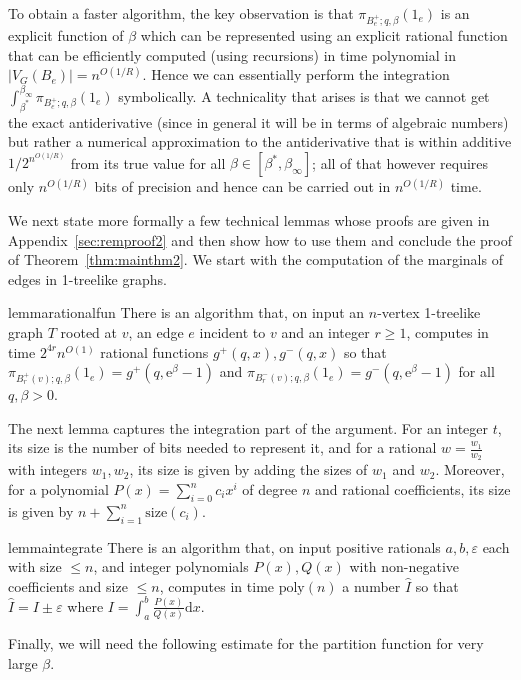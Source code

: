 \documentclass[11pt]{article}
\theoremstyle{plain}
\let\epsilon=\varepsilon
\newcommand{\emm}{\mathrm{e}}
\newcommand{\1}{\mathbb{1}}
\begin{document}
To obtain a faster algorithm, the key observation is that $\pi_{B_e^+;q,\beta}(1_e)$ is an explicit function of $\beta$ which can be represented using an explicit rational function that can be efficiently computed (using recursions) in time polynomial in $|V_G(B_e)|=n^{O(1/R)}$. Hence we can essentially perform the integration $\int^{\beta_\infty}_{\beta^*}\pi_{B_e^+;q,\beta}(1_e)$ symbolically. A technicality that arises is that we cannot get the exact antiderivative (since in general it will be in terms of algebraic numbers) but rather a numerical approximation to the antiderivative that is within additive $1/2^{n^{O(1/R)}}$ from its true value for all $\beta\in [\beta^*,\beta_\infty]$; all of that however requires only $n^{O(1/R)}$ bits of precision and hence can be carried out in $n^{O(1/R)}$ time.  

We next state more formally a few technical lemmas whose proofs are given in Appendix~\ref{sec:remproof2} and then show how to use them and conclude the proof of Theorem~\ref{thm:mainthm2}. We start with the computation of the marginals of edges in 1-treelike graphs.
\begin{restatable}{lemma}{rationalfun}\label{lem:rationalfun}
There is an algorithm that, on input an $n$-vertex  1-treelike graph $T$  rooted at $v$, an edge $e$ incident to $v$ and an integer $r\geq 1$, computes in time $2^{4r}n^{O(1)}$ rational functions $g^+(q,x), g^-(q,x)$ so that $\pi_{B^+_r(v);q,\beta}(1_e)=g^+(q,\emm^\beta-1)$ and $\pi_{B^-_r(v);q,\beta}(1_e)=g^-(q,\emm^{\beta}-1)$ for all $q,\beta>0$.
\end{restatable}
The next lemma captures the integration part of the argument. For an integer $t$, its size is the number of bits needed to represent it, and for a rational $w=\frac{w_1}{w_2}$ with integers $w_1,w_2$, its size is given by adding the sizes of $w_1$ and $w_2$. Moreover, for a polynomial $P(x)=\sum^n_{i=0}c_i x^{i}$ of degree $n$ and rational  coefficients, its size is given by   $n+\sum^n_{i=1}\mathrm{size}(c_i)$.
\begin{restatable}{lemma}{integrate}\label{lem:integrate}
There is an algorithm that, on input positive rationals $a,b, \epsilon$ each with size $\leq n$, and integer polynomials $P(x), Q(x)$ with non-negative coefficients and size $\leq n$, computes in time $\text{poly}(n)$ a number $\hat I$ so that $\hat I=I\pm \epsilon$ where $I=\displaystyle\int^b_{a}\frac{P(x)}{Q(x)}\mathrm{d} x$.
\end{restatable}
Finally, we will need the following estimate for the partition function for very large $\beta$.
\end{document}
